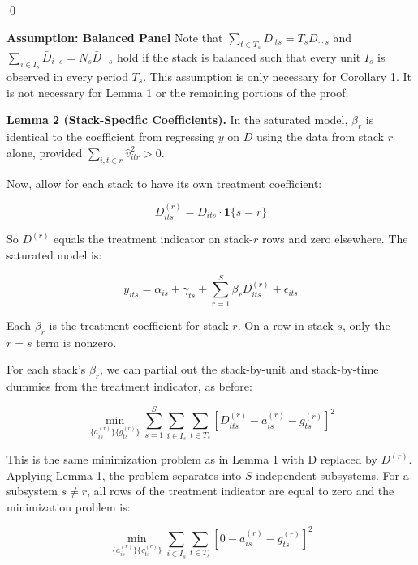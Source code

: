 \documentclass[12pt]{article}
\begin{document}
\qed

\textbf{Assumption: Balanced Panel} Note that $\sum_{t \in T_s} \bar{D}_{\cdot ts} = T_s \bar{D}_{\cdot \cdot s}$ and $\sum_{i \in I_s} \bar{D}_{i \cdot s} = N_s \bar{D}_{\cdot \cdot s}$ hold if the stack is balanced such that every unit $I_s$ is observed in every period $T_s$. This assumption is only necessary for Corollary 1. It is not necessary for Lemma 1 or the remaining portions of the proof.

\textbf{Lemma 2 (Stack-Specific Coefficients).} In the saturated model, $\hat{\beta}_r$ is identical to the coefficient from regressing $y$ on $D$ using the data from stack $r$ alone, provided $\sum_{i,t \in r} \hat{v}_{itr}^2 > 0$.

Now, allow for each stack to have its own treatment coefficient:

\begin{equation*}
    D_{its}^{(r)} = D_{its} \cdot \mathbf{1}\{s = r\}
\end{equation*}

So $D^{(r)}$ equals the treatment indicator on stack-$r$ rows and zero elsewhere. The saturated model is:

\begin{equation*}
    y_{its} = \alpha_{is} + \gamma_{ts} + \sum_{r = 1}^S \beta_r D_{its}^{(r)} + \epsilon_{its}
\end{equation*}

Each $\beta_r$ is the treatment coefficient for stack $r$. On a row in stack $s$, only the $r = s$ term is nonzero.

For each stack's $\beta_r$, we can partial out the stack-by-unit and stack-by-time dummies from the treatment indicator, as before:

\begin{equation*}
    \min_{\{a^{(r)}_{is}\}\{g^{(r)}_{ts}\}} \sum_{s=1}^S \sum_{i \in I_s} \sum_{t \in  T_s}[D^{(r)}_{its} - a^{(r)}_{is} - g^{(r)}_{ts}]^2
\end{equation*}

This is the same minimization problem as in Lemma 1 with D replaced by $D^{(r)}$. Applying Lemma 1, the problem separates into $S$ independent subsystems. For a subsystem $s \neq r$, all rows of the treatment indicator are equal to zero and the minimization problem is:

\begin{equation*}
    \min_{\{a^{(r)}_{is}\}\{g^{(r)}_{ts}\}} \sum_{i \in I_s} \sum_{t \in  T_s}[0 - a^{(r)}_{is} - g^{(r)}_{ts}]^2
\end{equation*}
\end{document}
